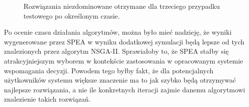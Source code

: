 \documentclass[twoside]{iisthesis}
\begin{document}
\begin{figure}
    \hfill
{}
    \hfill
{}
    \hfill
{}
\caption{Rozwiązania niezdominowane otrzymane dla trzeciego przypadku testowego po określonym czasie.}
    \label{fig:big_time_results}
\end{figure}
Po ocenie czasu działania algorytmów, można było mieć nadzieję, że wyniki wygenerowane przez SPEA w wyniku dodatkowej symulacji będą lepsze od tych znalezionych przez algorytm NSGA-II. Sprawiałoby to, że SPEA stałby się atrakcyjniejszym wyborem w kontekście zastosowania w opracowanym systemie wspomagania decyzji. Powodem tego byłby fakt, że dla potencjalnych użytkowników systemu większe znaczenie ma to jak szybko będą otrzymywać najlepsze rozwiązania, a nie ile konkretnych iteracji zajmie danemu algorytmowi znalezienie takich rozwiązań.
\end{document}
